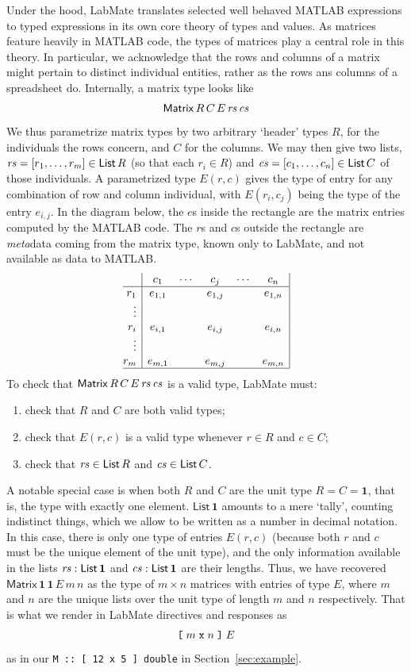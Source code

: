 \documentclass{IMEKO2024}
\newcommand{\lsb}{\texttt{\symbol{91}}}
\newcommand{\rsb}{\texttt{\symbol{93}}}
\newcommand{\One}{\mathbf{1}}
\newcommand{\Matrix}[5]{\mathsf{Matrix}\,#1\,#2\,#3\,#4\,#5}
\newcommand{\List}[1]{\mathsf{List}\,#1}
\newcommand{\remph}{\emph}
\newcommand{\param}{parametrize}
\begin{document}
Under the hood, LabMate translates selected well behaved MATLAB expressions
to typed expressions in its own core theory of types and values.
%
As matrices feature heavily in MATLAB code, the types of matrices
play a central role in this theory.
%
In particular, we acknowledge that the rows and columns of a matrix might pertain to distinct individual entities, rather as the rows ans columns of a spreadsheet do.
%
Internally, a matrix type looks like
\[\Matrix{R}{C}{E}{\rs}{\cs}
\]
%
We thus \param{} matrix types by two arbitrary `header' types $R$, for the individuals the rows concern, and $C$ for the columns. We may then give two lists, $\rs = [r_1,\ldots,r_m]\in\List{R}$ (so that each $r_i\in R$) and $\cs = [c_1,\ldots,c_n]\in\List{C}$ of those individuals. A \param{}d type $E(r,c)$ gives the type of entry for any combination of row and column individual, with $E(r_i,c_j)$ being the type of the entry $e_{i,j}$. In the diagram below, the $e$s inside the rectangle are the matrix entries computed by the MATLAB code. The $r$s and $c$s outside the rectangle are \remph{meta}data coming from the matrix type, known only to LabMate, and not available as data to MATLAB.
\[\begin{array}{@{}r|ccccc|}
\; & c_1      & \cdots & c_j     & \cdots & c_n     \\
\hline
r_1    & e_{1,1}  &        & e_{1,j} &        & e_{1,n} \\
\vdots &          &        &         &        &         \\
r_i    & e_{i,1}  &        & e_{i,j} &        & e_{i,n} \\
\vdots &          &        &         &        &         \\
r_m    & e_{m,1}  &        & e_{m,j} &        & e_{m,n}  \\
\hline
\end{array}\]
To check that $\Matrix{R}{C}{E}{\rs}{\cs}$ is a valid type, LabMate must:
\begin{enumerate}
\item check that $R$ and $C$ are both valid types;
\item check that $E(r,c)$ is a valid type whenever $r\in R$ and $c\in C$;
\item check that $\rs\in\List{R}$ and $\cs\in\List{C}$.
\end{enumerate}

A notable special case is when both $R$ and $C$ are the unit type $R = C = \One$, that is, the type with exactly one element.
%
$\List{\One}$ amounts to a mere `tally', counting indistinct things, which we allow to be written as a number in decimal notation.
%
In this case, there is only one type of entries $E(r,c)$ (because both $r$
and $c$ must be the unique element of the unit type), and the only
information available in the lists $\rs : \List{\One}$ and
$\cs : \List{\One}$ are their lengths.
%
Thus, we have recovered $\Matrix{\One}{\One}{E}{m}{n}$ as the type of
$m \times n$ matrices with entries of type $E$, where $m$ and $n$ are
the unique lists over the unit type of length $m$ and $n$
respectively.
%
That is what we render in LabMate directives and responses as
\[
\lsb \;m \;\texttt{x}\; n\; \rsb\; E
\]
as in our \texttt{M :: [ 12 x 5 ] double} in Section~\ref{sec:example}.
\end{document}
